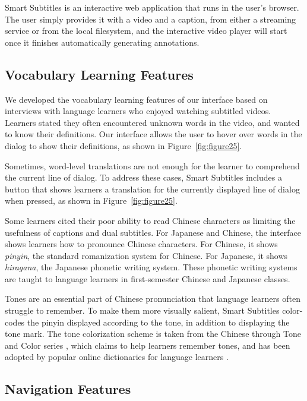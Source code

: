 \documentclass{sigchi}
\begin{document}
Smart Subtitles is an interactive web application that runs in the user's browser. The user simply provides it with a video and a caption, from either a streaming service or from the local filesystem,
and the interactive video player will start once it finishes automatically
generating annotations.

\subsection{Vocabulary Learning Features}

We developed the vocabulary learning features of our interface based
on interviews with language learners who enjoyed watching subtitled videos. Learners stated they often encountered
unknown words in the video, and wanted to know their definitions.
Our interface allows the user to hover over words in
the dialog to show their definitions, as shown in Figure~\ref{fig:figure25}.

Sometimes, word-level translations are not enough for the learner to comprehend the current line of dialog. To address these cases, Smart Subtitles includes a button that shows learners a translation for the currently displayed line of dialog when pressed, as shown in Figure~\ref{fig:figure25}.

Some learners cited their poor ability to
read Chinese characters
as limiting the usefulness of captions and dual subtitles.
For Japanese and Chinese, the interface shows learners how to pronounce
Chinese characters. For Chinese, it shows \emph{pinyin}, the standard romanization system for Chinese. For Japanese, it shows \emph{hiragana}, the Japanese phonetic writing system. These phonetic writing systems are taught to
language learners in first-semester Chinese and Japanese classes.

Tones are an essential part of Chinese pronunciation that language learners often struggle to remember. To make them more visually salient, Smart Subtitles color-codes the pinyin displayed according to the tone, in addition to displaying the tone mark. The tone colorization scheme is taken from the Chinese through Tone and Color series \cite{tonecolor}, which claims to help learners remember tones, and has been adopted by popular online dictionaries for language learners \cite{mdbg}.

\subsection{Navigation Features}
\end{document}
